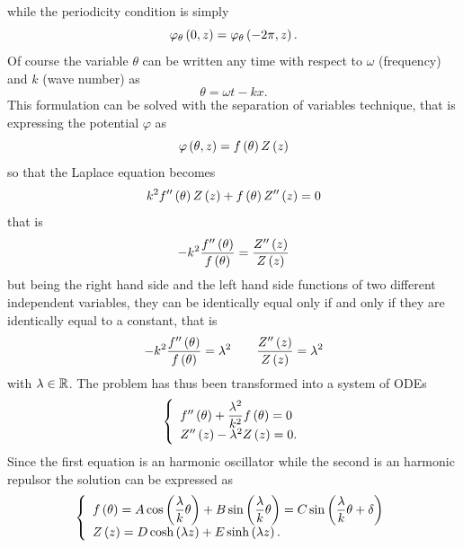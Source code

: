 while the periodicity condition is simply
\begin{equation*}
\varphi_{\theta}\left( 0,z \right)=\varphi_{\theta}\left( -2\pi,z \right).
\end{equation*}
Of course the variable $\theta$ can be written any time with respect to $\omega$ (frequency) and $k$ (wave number) as
\begin{equation}
\theta=\omega t -kx.
\end{equation}
This formulation can be solved with the separation of variables technique, that is expressing the potential $\varphi$ as
\begin{equation}
\varphi\left( \theta,z \right)=f\left( \theta \right)Z\left( z \right)
\end{equation}
so that the Laplace equation becomes 
\begin{equation*}
k^{2}f''\left( \theta \right)Z\left( z \right)+f\left( \theta \right)Z''\left( z \right)=0
\end{equation*}
that is
\begin{equation*}
-k^{2}\dfrac{f''\left( \theta \right)}{f\left( \theta \right)}=\dfrac{Z''\left( z \right)}{Z\left( z \right)}
\end{equation*}
but being the right hand side and the left hand side functions of two different independent variables, they can be identically equal only if and only if they are identically equal to a constant, that is
\begin{equation*}
-k^{2}\dfrac{f''\left( \theta \right)}{f\left( \theta \right)}=\lambda^{2}\qquad\dfrac{Z''\left( z \right)}{Z\left( z \right)}=\lambda^{2}
\end{equation*}
with $\lambda\in\mathbb{ R}$. The problem has thus been transformed into a system of ODEs
\begin{equation}
\left\lbrace\begin{array}{l}
f''\left( \theta \right)+\dfrac{\lambda^{2}}{k^{2}}f\left( \theta \right)=0 \\
Z''\left( z \right)-\lambda^{2}Z\left( z \right)=0.
\end{array}\right.
\end{equation}
Since the first equation is an harmonic oscillator while the second is an harmonic repulsor the solution can be expressed as
\begin{equation}
\left\lbrace\begin{array}{l}
f\left( \theta \right)=A\cos\left( \dfrac{\lambda}{k}\theta \right)+B\sin\left( \dfrac{\lambda}{k}\theta \right)=C\sin\left( \dfrac{\lambda}{k}\theta+\delta \right)\\
Z\left( z \right)=D\cosh\left( \lambda z \right)+E\sinh\left( \lambda z \right).
\end{array}\right.
\end{equation}
